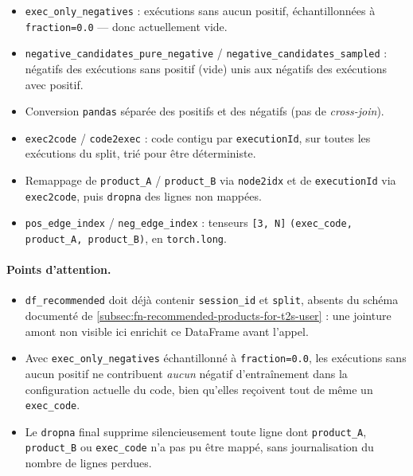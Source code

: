 \documentclass[11pt,a4paper]{article}
\newcommand{\code}[1]{\texttt{\small #1}}
\begin{document}
\begin{itemize}[nosep,leftmargin=*]
        positif le plus profond de leur exécution.
  \item \code{exec\_only\_negatives} : exécutions sans aucun positif,
        échantillonnées à \code{fraction=0.0} --- donc actuellement vide.
  \item \code{negative\_candidates\_pure\_negative} /
        \code{negative\_candidates\_sampled} : négatifs des exécutions sans
        positif (vide) unis aux négatifs des exécutions avec positif.
  \item Conversion \code{pandas} séparée des positifs et des négatifs (pas de
        \emph{cross-join}).
  \item \code{exec2code} / \code{code2exec} : code contigu par
        \code{executionId}, sur toutes les exécutions du split, trié pour
        être déterministe.
  \item Remappage de \code{product\_A} / \code{product\_B} via
        \code{node2idx} et de \code{executionId} via \code{exec2code}, puis
        \code{dropna} des lignes non mappées.
  \item \code{pos\_edge\_index} / \code{neg\_edge\_index} : tenseurs
        \code{[3, N]} \code{(exec\_code, product\_A, product\_B)}, en
        \code{torch.long}.
\end{itemize}

\paragraph{Points d'attention.}
\begin{itemize}[nosep,leftmargin=*]
  \item \code{df\_recommended} doit déjà contenir \code{session\_id} et
        \code{split}, absents du schéma documenté de
        \ref{subsec:fn-recommended-products-for-t2s-user} : une jointure amont
        non visible ici enrichit ce DataFrame avant l'appel.
  \item Avec \code{exec\_only\_negatives} échantillonné à
        \code{fraction=0.0}, les exécutions sans aucun positif ne contribuent
        \emph{aucun} négatif d'entraînement dans la configuration actuelle du
        code, bien qu'elles reçoivent tout de même un \code{exec\_code}.
  \item Le \code{dropna} final supprime silencieusement toute ligne dont
        \code{product\_A}, \code{product\_B} ou \code{exec\_code} n'a pas pu
        être mappé, sans journalisation du nombre de lignes perdues.
\end{itemize}
\end{document}
